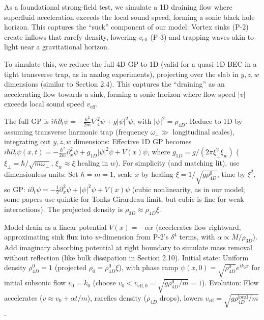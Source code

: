 \documentclass{article}
\begin{document}
As a foundational strong-field test, we simulate a 1D draining flow where superfluid acceleration exceeds the local sound speed, forming a sonic black hole horizon. This captures the ``suck'' component of our model: Vortex sinks (P-2) create inflows that rarefy density, lowering $v_{\text{eff}}$ (P-3) and trapping waves akin to light near a gravitational horizon.

To simulate this, we reduce the full 4D GP to 1D (valid for a quasi-1D BEC in a tight transverse trap, as in analog experiments), projecting over the slab in $y,z,w$ dimensions (similar to Section 2.4). This captures the ``draining'' as an accelerating flow towards a sink, forming a sonic horizon where flow speed $|v|$ exceeds local sound speed $v_{\text{eff}}$.

The full GP is $i \hbar \partial_t \psi = -\frac{\hbar^2}{2m} \nabla_4^2 \psi + g |\psi|^2 \psi$, with $|\psi|^2 = \rho_{4D}$. Reduce to 1D by assuming transverse harmonic trap (frequency $\omega_\perp \gg$ longitudinal scales), integrating out $y,z,w$ dimensions: Effective 1D GP becomes $i \hbar \partial_t \psi(x,t) = -\frac{\hbar^2}{2m} \partial_x^2 \psi + g_{1D} |\psi|^2 \psi + V(x) \psi$, where $g_{1D} = g / (2\pi \xi_\perp^2 \xi_w)$ ($\xi_\perp = \hbar / \sqrt{m \omega_\perp}$, $\xi_w \approx \xi$ healing in $w$). For simplicity (and matching lit), use dimensionless units: Set $\hbar = m = 1$, scale $x$ by healing $\xi = 1 / \sqrt{g \rho_{4D}^0}$, time by $\xi^2$, so GP: $i \partial_t \psi = -\frac{1}{2} \partial_x^2 \psi + |\psi|^2 \psi + V(x) \psi$ (cubic nonlinearity, as in our model; some papers use quintic for Tonks-Girardeau limit, but cubic is fine for weak interactions). The projected density is $\rho_{3D} \approx \rho_{4D} \xi$.

Model drain as a linear potential $V(x) = -\alpha x$ (accelerates flow rightward, approximating sink flux into $w$-dimension from P-2's $\delta^4$ terms, with $\alpha \propto \dot{M} / \rho_{3D}$). Add imaginary absorbing potential at right boundary to simulate mass removal without reflection (like bulk dissipation in Section 2.10). Initial state: Uniform density $\rho_{4D}^0 = 1$ (projected $\rho_0 = \rho_{4D}^0 \xi$), with phase ramp $\psi(x,0) = \sqrt{\rho_{4D}^0} e^{i k_0 x}$ for initial subsonic flow $v_0 = k_0$ (choose $v_0 < v_{\text{eff},0} = \sqrt{g \rho_{4D}^0 / m} = 1$). Evolution: Flow accelerates ($v \approx v_0 + \alpha t / m$), rarefies density ($\rho_{4D}$ drops), lowers $v_{\text{eff}} = \sqrt{g \rho_{4D}^{\text{local}} / m}$.
\end{document}
